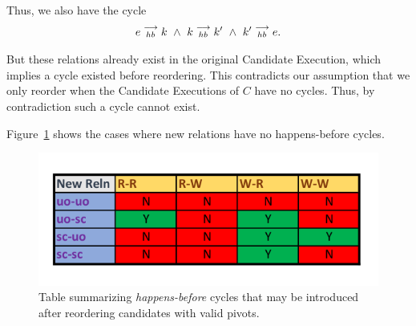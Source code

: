     Thus, we also have the cycle 
    \begin{align*}
        \reln{e}{hb}{k} \ \wedge \
        \reln{k}{hb}{k'} \ \wedge \ 
        \reln{k'}{hb}{e}. 
    \end{align*}

    But these relations already exist in the original Candidate Execution, which implies a cycle existed before reordering. 
    This contradicts our assumption that we only reorder when the Candidate Executions of $C$ have no cycles. 
    Thus, by contradiction such a cycle cannot exist.

    Figure~\ref{reord:cycle_table} shows the cases where new relations have no happens-before cycles. 
    \begin{figure}[H]
        \centering
        \includegraphics[scale=0.7]{5.InstructionReordering/4.ValidReorderingCandidate/ProofParts/Part3/part3_table.pdf}
        \caption{Table summarizing \textit{happens-before} cycles that may be introduced after reordering candidates with valid pivots.}
        \label{reord:cycle_table}
    \end{figure}